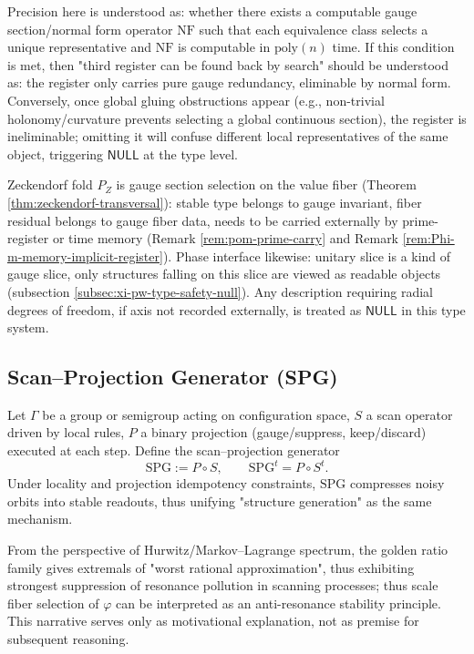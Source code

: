 \begin{remark}\label{rem:pom-gauge-normal-form}
Precision here is understood as: whether there exists a computable gauge section/normal form operator \(\mathrm{NF}\) such that each equivalence class selects a unique representative and \(\mathrm{NF}\) is computable in \(\mathrm{poly}(n)\) time. If this condition is met, then "third register can be found back by search" should be understood as: the register only carries pure gauge redundancy, eliminable by normal form. Conversely, once global gluing obstructions appear (e.g., non-trivial holonomy/curvature prevents selecting a global continuous section), the register is ineliminable; omitting it will confuse different local representatives of the same object, triggering \(\mathsf{NULL}\) at the type level.
\end{remark}

\begin{remark}\label{rem:pom-gauge-zeck-phase-null}
Zeckendorf fold \(P_Z\) is gauge section selection on the value fiber (Theorem \ref{thm:zeckendorf-transversal}): stable type belongs to gauge invariant, fiber residual belongs to gauge fiber data, needs to be carried externally by prime-register or time memory (Remark \ref{rem:pom-prime-carry} and Remark \ref{rem:Phi-m-memory-implicit-register}). Phase interface likewise: unitary slice is a kind of gauge slice, only structures falling on this slice are viewed as readable objects (subsection \ref{subsec:xi-pw-type-safety-null}). Any description requiring radial degrees of freedom, if axis not recorded externally, is treated as \(\mathsf{NULL}\) in this type system.
\end{remark}


\subsection{Scan–Projection Generator (SPG)}\label{subsec:pom-spg}
\begin{definition}\label{def:pom-spg}
Let $\Gamma$ be a group or semigroup acting on configuration space, $S$ a scan operator driven by local rules, $P$ a binary projection (gauge/suppress, keep/discard) executed at each step. Define the scan–projection generator
\[
\mathrm{SPG}:=P\circ S,
\qquad
\mathrm{SPG}^t=P\circ S^t.
\]
Under locality and projection idempotency constraints, $\mathrm{SPG}$ compresses noisy orbits into stable readouts, thus unifying "structure generation" as the same mechanism.
\end{definition}
\begin{remark}\label{rem:pom-anti-resonance}
From the perspective of Hurwitz/Markov–Lagrange spectrum, the golden ratio family gives extremals of "worst rational approximation", thus exhibiting strongest suppression of resonance pollution in scanning processes; thus scale fiber selection of $\varphi$ can be interpreted as an anti-resonance stability principle. This narrative serves only as motivational explanation, not as premise for subsequent reasoning.
\end{remark}

